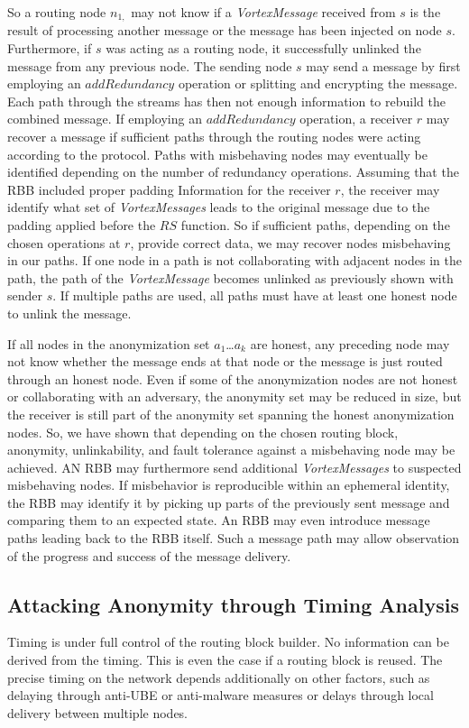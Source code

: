 So a routing node $n_{1,}$ may not know if a \emph{VortexMessage} received from $s$ is the result of processing another message or the message has been injected on node $s$. Furthermore, if $s$ was acting as a routing node, it successfully unlinked the message from any previous node. The sending node $s$ may send a message by first employing an $addRedundancy$ operation or splitting and encrypting the message. Each path through the streams has then not enough information to rebuild the combined message. If employing an $addRedundancy$ operation, a receiver $r$ may recover a message if sufficient paths through the routing nodes were acting according to the protocol. Paths with misbehaving nodes may eventually be identified depending on the number of redundancy operations. Assuming that the RBB included proper padding Information for the receiver $r$, the receiver may identify what set of \emph{VortexMessages} leads to the original message due to the padding applied before the $RS$ function. So if sufficient paths, depending on the chosen operations at $r$, provide correct data, we may recover nodes misbehaving in our paths. If one node in a path is not collaborating with adjacent nodes in the path, the path of the \emph{VortexMessage} becomes unlinked as previously shown with sender $s$. If multiple paths are used, all paths must have at least one honest node to unlink the message. 

If all nodes in the anonymization set $a_1$\ldots$a_k$ are honest, any preceding node may not know whether the message ends at that node or the message is just routed through an honest node. Even if some of the anonymization nodes are not honest or collaborating with an adversary, the anonymity set may be reduced in size, but the receiver is still part of the anonymity set spanning the honest anonymization nodes. So, we have shown that depending on the chosen routing block, anonymity, unlinkability, and fault tolerance against a misbehaving node may be achieved. AN RBB may furthermore send additional \emph{VortexMessages} to suspected misbehaving nodes. If misbehavior is reproducible within an ephemeral identity, the RBB may identify it by picking up parts of the previously sent message and comparing them to an expected state. An RBB may even introduce message paths leading back to the RBB itself. Such a message path may allow observation of the progress and success of the message delivery.

\subsection{Attacking Anonymity through Timing Analysis}
Timing is under full control of the routing block builder. No information can be derived from the timing. This is even the case if a routing block is reused. The precise timing on the network depends additionally on other factors, such as delaying through anti-UBE or anti-malware measures or delays through local delivery between multiple nodes.

